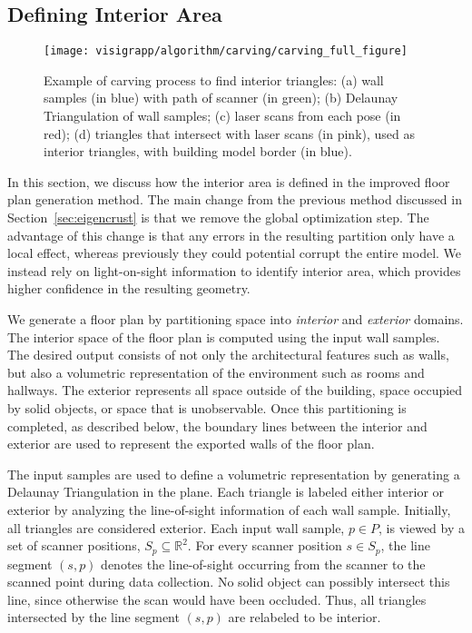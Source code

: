 \documentclass[12pt,onecolumn,oneside]{book}
\begin{document}
\subsection{Defining Interior Area}
\label{ssec:visigrapp_carving}

\begin{figure}[t]
  \centering
  \texttt{[image: visigrapp/algorithm/carving/carving\_full\_figure]}
  \caption[Carving process to find interior triangles.]{Example of carving process to find interior triangles:  (a) wall samples (in blue) with path of scanner (in green); (b) Delaunay Triangulation of wall samples; (c) laser scans from each pose (in red); (d) triangles that intersect with laser scans (in pink), used as interior triangles, with building model border (in blue).}
  \label{fig:visigrapp_floorplan_creation}
\end{figure}

In this section, we discuss how the interior area is defined in the improved floor plan generation method.  The main change from the previous method discussed in Section~\ref{sec:eigencrust} is that we remove the global optimization step.  The advantage of this change is that any errors in the resulting partition only have a local effect, whereas previously they could potential corrupt the entire model.  We instead rely on light-on-sight information to identify interior area, which provides higher confidence in the resulting geometry.

We generate a floor plan by partitioning space into {\it interior} and {\it exterior} domains.  The interior space of the floor plan is computed using the input wall samples.  The desired output consists of not only the architectural features such as walls, but also a volumetric representation of the environment such as rooms and hallways.  The exterior represents all space outside of the building, space occupied by solid objects, or space that is unobservable.  Once this partitioning is completed, as described below, the boundary lines between the interior and exterior are used to represent the exported walls of the floor plan.

The input samples are used to define a volumetric representation by generating a Delaunay Triangulation in the plane.  Each triangle is labeled either interior or exterior by analyzing the line-of-sight information of each wall sample.  Initially, all triangles are considered exterior.  Each input wall sample, $p \in P$, is viewed by a set of scanner positions, $S_p \subseteq \mathbb{R}^2$.  For every scanner position $s \in S_p$, the line segment $(s,p)$ denotes the line-of-sight occurring from the scanner to the scanned point during data collection.  No solid object can possibly intersect this line, since otherwise the scan would have been occluded.  Thus, all triangles intersected by the line segment $(s,p)$ are relabeled to be interior.
\end{document}
